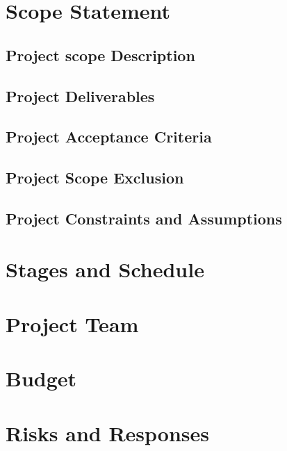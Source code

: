 \documentclass{VUMIFPSkursinis}
\begin{document}
\section{Scope Statement}
	\subsection{Project scope Description}

	\subsection{Project Deliverables}

	\subsection{Project Acceptance Criteria}

	\subsection{Project Scope Exclusion}

	\subsection{Project Constraints and Assumptions}

\section{Stages and Schedule}

\section{Project Team}

\section{Budget}

\section{Risks and Responses}
\end{document}
